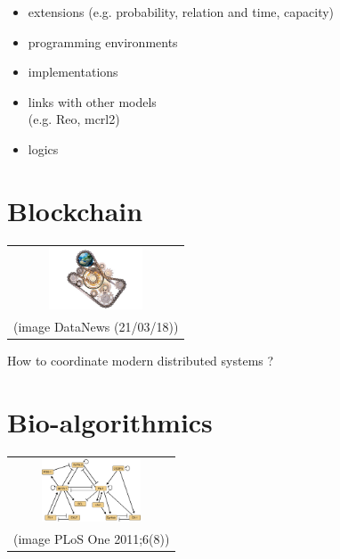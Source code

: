 \documentclass[portrait,final,a0paper]{nadiposter}
\newcommand{\compresslist}{%
\setlength{\itemsep}{1pt}%
\setlength{\parskip}{0pt}%
\setlength{\parsep}{0pt}%
\setlength{\leftmargin}{0pt}%
}
\begin{document}
\begin{poster}
{\begin{multicols}{3}
\begin{itemize}
\compresslist

\item extensions (e.g. probability, relation and time, capacity)
\item programming environments
\item implementations
\item links with other models \\(e.g. Reo, mcrl2)
\item logics

\end{itemize}

\section*{Blockchain}

\begin{center}
\begin{tabular}{c}
\includegraphics[height=5em]{images/blockchain.jpg}\\
(image DataNews (21/03/18)) \\
\end{tabular}
\end{center}

\begin{center}
How to coordinate modern distributed systems ? 
\end{center}


\section*{Bio-algorithmics}

\begin{center}
\begin{tabular}{c}
\includegraphics[height=5em]{images/gnr.png}\\
(image PLoS One 2011;6(8)) \\
\end{tabular}
\end{center}


\end{multicols}}
\end{poster}
\end{document}
